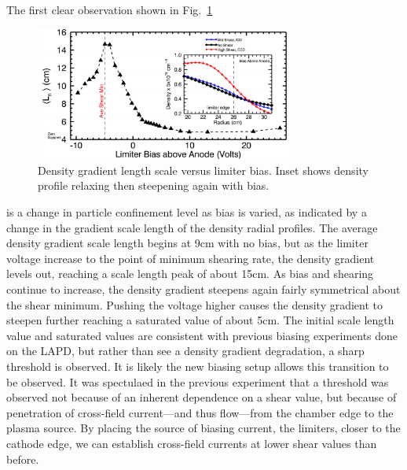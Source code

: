 \documentclass[%
 aps,
 prl,
 amsmath,amssymb,
 reprint,%
]{revtex4-1}
\begin{document}

The first clear observation shown in
Fig.~\ref{fig:densgrad}
\begin{center}
\begin{figure}
\includegraphics[width=8.5cm]{densgrad.pdf}%
\caption{\label{fig:densgrad} Density gradient length scale versus limiter bias. Inset shows density profile relaxing then steepening again with bias.}
\end{figure}
\end{center}
is a change in particle confinement level as bias is varied, as indicated by a change in the gradient scale length of the density radial profiles. The average density gradient scale length begins at 9cm with no bias, but as the limiter voltage increase to the point of minimum shearing rate, the density gradient levels out, reaching a scale length peak of about 15cm. As bias and shearing continue to increase, the density gradient steepens again fairly symmetrical about the shear minimum. Pushing the voltage higher causes the density gradient to steepen further reaching a saturated value of about 5cm. The initial scale length value and saturated values are consistent with previous biasing experiments done on the LAPD\cite{carter09}, but rather than see a density gradient degradation, a sharp threshold is observed. It is likely the new biasing setup allows this transition to be observed. It was spectulaed in the previous experiment that a threshold was observed not because of an inherent dependence on a shear value, but because of penetration of cross-field current---and thus flow---from the chamber edge to the plasma source. By placing the source of biasing current, the limiters, closer to the cathode edge, we can establish cross-field currents at lower shear values than before.
\end{document}
